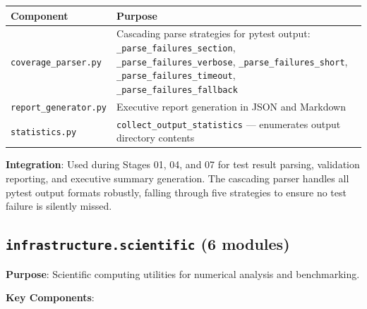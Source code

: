 \documentclass[
]{article}
\newcounter{none} %
\begin{document}
{\def\LTcaptype{none} %
\begin{longtable}[]{@{}
  >{\raggedright\arraybackslash}p{}
  >{\raggedright\arraybackslash}p{}@{}}
\toprule\noalign{}
\begin{minipage}[b]{\linewidth}\raggedright
Component
\end{minipage} & \begin{minipage}[b]{\linewidth}\raggedright
Purpose
\end{minipage} \\
\midrule\noalign{}
\endhead
\bottomrule\noalign{}
\endlastfoot
\texttt{coverage\_parser.py} & Cascading parse strategies for pytest
output: \texttt{\_parse\_failures\_section},
\texttt{\_parse\_failures\_verbose}, \texttt{\_parse\_failures\_short},
\texttt{\_parse\_failures\_timeout},
\texttt{\_parse\_failures\_fallback} \\
\texttt{report\_generator.py} & Executive report generation in JSON and
Markdown \\
\texttt{statistics.py} & \texttt{collect\_output\_statistics} ---
enumerates output directory contents \\
\end{longtable}
}

\textbf{Integration}: Used during Stages 01, 04, and 07 for test result
parsing, validation reporting, and executive summary generation. The
cascading parser handles all pytest output formats robustly, falling
through five strategies to ensure no test failure is silently missed.

\subsection{\texorpdfstring{\texttt{infrastructure.scientific} (6
modules)}{infrastructure.scientific (6 modules)}}\label{infrastructure.scientific-6-modules}

\textbf{Purpose}: Scientific computing utilities for numerical analysis
and benchmarking.

\textbf{Key Components}:
\end{document}
